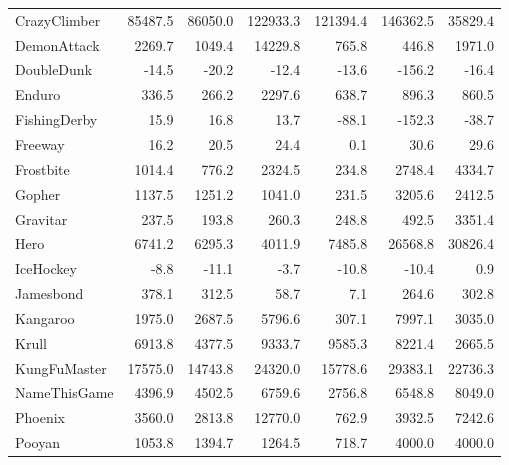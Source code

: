 \begin{table}[H]
{\begin{tabular}{lrrrrrr}
CrazyClimber   &    85487.5 &   86050.0 &               122933.3 &  121394.4 &        146362.5 &  35829.4 \\
DemonAttack    &     2269.7 &    1049.4 &                14229.8 &     765.8 &           446.8 &   1971.0 \\
DoubleDunk     &      -14.5 &     -20.2 &                  -12.4 &     -13.6 &          -156.2 &    -16.4 \\
Enduro         &      336.5 &     266.2 &                 2297.6 &     638.7 &           896.3 &    860.5 \\
FishingDerby   &       15.9 &      16.8 &                   13.7 &     -88.1 &          -152.3 &    -38.7 \\
Freeway        &       16.2 &      20.5 &                   24.4 &       0.1 &            30.6 &     29.6 \\
Frostbite      &     1014.4 &     776.2 &                 2324.5 &     234.8 &          2748.4 &   4334.7 \\
Gopher         &     1137.5 &    1251.2 &                 1041.0 &     231.5 &          3205.6 &   2412.5 \\
Gravitar       &      237.5 &     193.8 &                  260.3 &     248.8 &           492.5 &   3351.4 \\
Hero           &     6741.2 &    6295.3 &                 4011.9 &    7485.8 &         26568.8 &  30826.4 \\
IceHockey      &       -8.8 &     -11.1 &                   -3.7 &     -10.8 &           -10.4 &      0.9 \\
Jamesbond      &      378.1 &     312.5 &                   58.7 &       7.1 &           264.6 &    302.8 \\
Kangaroo       &     1975.0 &    2687.5 &                 5796.6 &     307.1 &          7997.1 &   3035.0 \\
Krull          &     6913.8 &    4377.5 &                 9333.7 &    9585.3 &          8221.4 &   2665.5 \\
KungFuMaster   &    17575.0 &   14743.8 &                24320.0 &   15778.6 &         29383.1 &  22736.3 \\
NameThisGame   &     4396.9 &    4502.5 &                 6759.6 &    2756.8 &          6548.8 &   8049.0 \\
Phoenix        &     3560.0 &    2813.8 &                12770.0 &     762.9 &          3932.5 &   7242.6 \\
Pooyan         &     1053.8 &    1394.7 &                 1264.5 &     718.7 &          4000.0 &   4000.0 \\

\end{tabular}}
\end{table}
